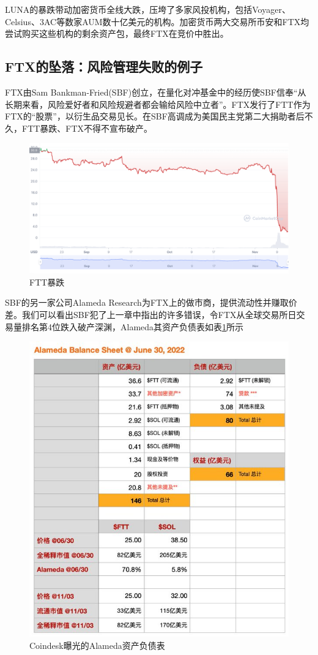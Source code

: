 LUNA的暴跌带动加密货币全线大跌，压垮了多家风投机构，包括Voyager、Celsius、3AC等数家AUM数十亿美元的机构。加密货币两大交易所币安和FTX均尝试购买这些机构的剩余资产包，最终FTX在竞价中胜出。
\subsection{FTX的坠落：风险管理失败的例子}
FTX由Sam Bankman-Fried(SBF)创立，在量化对冲基金中的经历使SBF信奉“从长期来看，风险爱好者和风险规避者都会输给风险中立者”。FTX发行了FTT作为FTX的“股票”，以衍生品交易见长。在SBF高调成为美国民主党第二大捐助者后不久，FTT暴跌、FTX不得不宣布破产。
\begin{figure}
    \includegraphics[width=\linewidth]{img/ftt.png}
    \caption{FTT暴跌}
\end{figure}

SBF的另一家公司Alameda Research为FTX上的做市商，提供流动性并赚取价差。我们可以看出SBF犯了上一章中指出的许多错误，令FTX从全球交易所日交易量排名第4位跌入破产深渊，Alameda其资产负债表如表\ref{fig:bs}所示
\begin{figure}[H]
    \includegraphics[width=\linewidth]{img/alameda_bs.jpeg}
    \caption{Coindesk曝光的Alameda资产负债表}\label{fig:bs}
\end{figure}

